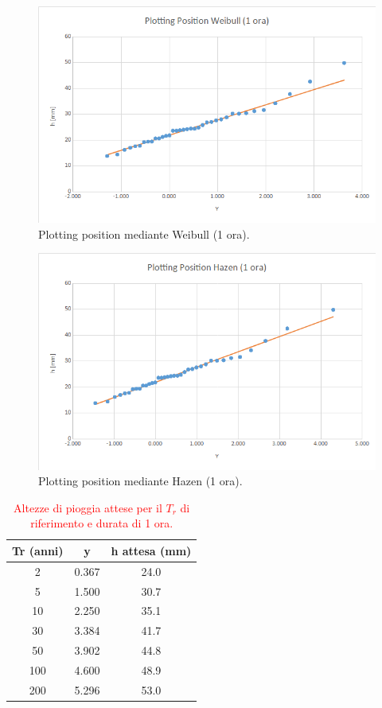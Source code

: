 \begin{figure}[H]\centering
        \includegraphics[scale=.5]{immagini/plot_pos_weib_1ora.png}
        \caption{Plotting position mediante Weibull (1 ora).}
      \label{plot_pos_weib_1ora}
 \end{figure}

\begin{figure}[H]\centering
        \includegraphics[scale=.5]{immagini/plot_pos_hazen_1ora.png}
        \caption{Plotting position mediante Hazen (1 ora).}
      \label{plot_pos_hazen_1ora}
\end{figure}

\begin{table}[H] \centering
    \caption{\textcolor{red}{Altezze di pioggia attese per il $T_r$ di riferimento e durata di 1 ora.}}
        \begin{tabular}{ccc}
        \toprule
        Tr (anni) & y     & h attesa (mm) \\
        \midrule
        2 & 0.367 & 24.0  \\
        5 & 1.500 & 30.7  \\
        10  & 2.250 & 35.1          \\
        30  & 3.384 & 41.7          \\
        50  & 3.902 & 44.8          \\
        100 & 4.600 & 48.9          \\
        200 & 5.296 & 53.0          \\         
        \bottomrule
        \end{tabular}
\end{table}

